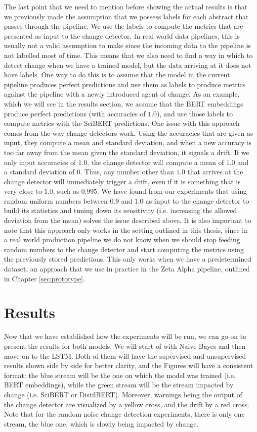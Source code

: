 \documentclass[12pt]{extreport}
\begin{document}
The last point that we need to mention before showing the actual results is that we previously made the assumption that we possess labels for each abstract that passes through the pipeline. We use the labels to compute the metrics that are presented as input to the change detector. In real world data pipelines, this is usually not a valid assumption to make since the incoming data to the pipeline is not labelled most of time. This means that we also need to find a way in which to detect change when we have a trained model, but the data arriving at it does not have labels. One way to do this is to assume that the model in the current pipeline produces perfect predictions and use them as labels to produce metrics against the pipeline with a newly introduced agent of change. As an example, which we will see in the results section, we assume that the BERT embeddings produce perfect predictions (with accuracies of $1.0$), and use those labels to compute metrics with the SciBERT predictions. One issue with this approach comes from the way change detectors work. Using the accuracies that are given as input, they compute a mean and standard deviation, and when a new accuracy is too far away from the mean given the standard deviation, it signals a drift. If we only input accuracies of $1.0$, the change detector will compute a mean of $1.0$ and a standard deviation of $0$. Thus, any number other than $1.0$ that arrives at the change detector will immediately trigger a drift, even if it is something that is very close to $1.0$, such as $0.995$. We have found from our experiments that using random uniform numbers between $0.9$ and $1.0$ as input to the change detector to build its statistics and tuning down its sensitivity (i.e. increasing the allowed deviation from the mean) solves the issue described above. It is also important to note that this approach only works in the setting outlined in this thesis, since in a real world production pipeline we do not know when we should stop feeding random numbers to the change detector and start computing the metrics using the previously stored predictions. This only works when we have a predetermined dataset, an approach that we use in practice in the Zeta Alpha pipeline, outlined in Chapter \ref{sec:prototype}.

\section{Results}

Now that we have established how the experiments will be run, we can go on to present the results for both models. We will start of with Naive Bayes and then move on to the LSTM. Both of them will have the supervised and unsupervised results shown side by side for better clarity, and the Figures will have a consistent format: the blue stream will be the one on which the model was trained (i.e. BERT embeddings), while the green stream will be the stream impacted by change (i.e. SciBERT or DistilBERT). Moreover, warnings being the output of the change detector are visualized by a yellow cross, and the drift by a red cross. Note that for the random noise change detection experiments, there is only one stream, the blue one, which is slowly being impacted by change.
\end{document}
